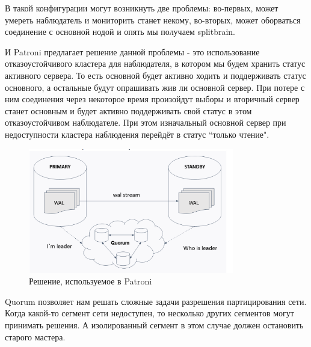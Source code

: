 В такой конфигурации могут возникнуть две проблемы: во-первых, может умереть наблюдатель и мониторить станет некому, во-вторых, может оборваться соединение с основной нодой и опять мы получаем splitbrain. 

И Patroni предлагает решение данной проблемы - это использование отказоустойчивого кластера для наблюдателя, в котором мы будем хранить статус активного сервера. То есть основной будет активно ходить и поддерживать статус основного, а остальные будут опрашивать жив ли основной сервер. При потере с ним соединения через некоторое время произойдут выборы и вторичный сервер станет основным и будет активно поддерживать свой статус в этом отказоустойчивом наблюдателе. При этом изначальный основной сервер при недоступности кластера наблюдения перейдёт в статус “только чтение".

\begin{figure}[h]
    \centering
    \includegraphics[width=0.8\textwidth]{assets/Patroni5.png}
    \caption{Решение, используемое в Patroni}
    \label{fig:mesh7}
\end{figure}

Quorum позволяет нам решать сложные задачи разрешения партицирования сети. Когда какой-то сегмент сети недоступен, то несколько других сегментов могут принимать решения. А изолированный сегмент в этом случае должен остановить старого мастера. 

